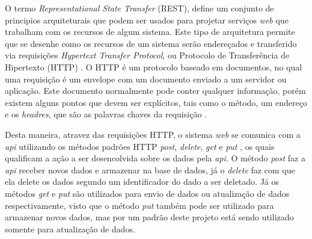 	O termo \textit{Representational State Transfer} (REST), define um conjunto de principios arquiteturais que podem ser usados para projetar serviços \textit{web} que trabalham com os recursos de algum sistema. Este tipo de arquitetura permite que se desenhe como os recursos de um sistema serão endereçados e transferido via requisições \textit{Hypertext Transfer Protocol}, ou Protocolo de Transferência de Hipertexto (HTTP) \cite{Rodriguez2008}. O HTTP é um protocolo baseado em documentos, no qual uma requisição é um envelope com um documento enviado a um servidor ou aplicação. Este documento normalmente pode conter qualquer informação, porém existem alguns pontos que devem ser explícitos, tais como o método, um endereço e os \textit{headres}, que são as palavras chaves da requisição \cite{Masse2011}.

    Desta maneira, atravez das requisições HTTP, o sistema \textit{web} se comunica com a \textit{api} utilizando os métodos padrões HTTP \textit{post}, \textit{delete}, \textit{get} e \textit{put} \cite{Rodriguez2008}, os quais qualificam a ação a ser desencolvida sobre os dados pela \textit{api}. O método \textit{post} faz a \textit{api} receber novos dados e armazenar na base de dados, já o \textit{delete} faz com que ela delete os dados segundo um identificador do dado a ser deletado. Já os métodos \textit{get} e \textit{put} são utilizados para envio de dados ou atualização de dados respectivamente, visto que o método \textit{put} também pode ser utilizado para armazenar novos dados, mas por um padrão deste projeto está sendo utilizado somente para atualização de dados.

   
    
